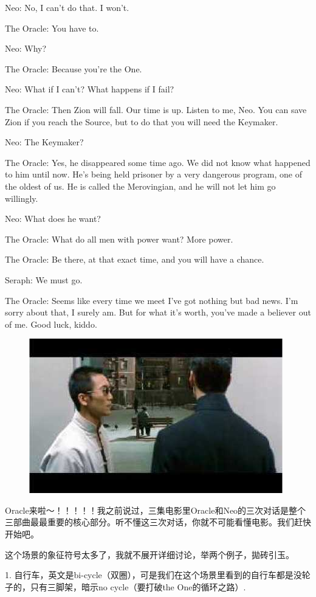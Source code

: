 \documentclass[UTF8]{ctexart}
\newenvironment{myquote}{\color{green} \setlength{\leftskip}{6em} \setlength{\rightskip}{4em} \setlength{\parindent}{-2em}}{\par}
\begin{document}
\begin{myquote}
Neo: No, I can't do that. I won't.

The Oracle: You have to.

Neo: Why?

The Oracle: Because you're the One.

Neo: What if I can't? What happens if I fail?

The Oracle: Then Zion will fall. Our time is up. Listen to me, Neo. You can save Zion if you reach the Source, but to do that you will need the Keymaker.

Neo: The Keymaker?

The Oracle: Yes, he disappeared some time ago. We did not know what happened to him until now. He's being held prisoner by a very dangerous program, one of the oldest of us. He is called the Merovingian, and he will not let him go willingly.

Neo: What does he want?

The Oracle: What do all men with power want? More power.

The Oracle: Be there, at that exact time, and you will have a chance.

Seraph: We must go.

The Oracle: Seems like every time we meet I've got nothing but bad news. I'm sorry about that, I surely am. But for what it's worth, you've made a believer out of me. Good luck, kiddo.
\end{myquote}

\begin{figure}[htb]
\centering
\includegraphics[width=0.5\linewidth]{fig/read_reloaded-64}
\end{figure}

Oracle来啦～！！！！！我之前说过，三集电影里Oracle和Neo的三次对话是整个三部曲最最重要的核心部分。听不懂这三次对话，你就不可能看懂电影。我们赶快开始吧。

这个场景的象征符号太多了，我就不展开详细讨论，举两个例子，拋砖引玉。

1. 自行车，英文是bi-cycle（双圈），可是我们在这个场景里看到的自行车都是没轮子的，只有三脚架，暗示no cycle（要打破the One的循环之路）.
\end{document}
